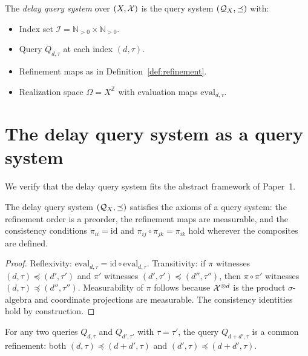 \begin{definition}\label{def:delay-query-system}
The \emph{delay query system} over $(X, \mathcal{X})$ is the query system
$(\mathcal{Q}_X, \preceq)$ with:
\begin{itemize}
  \item Index set $\mathcal{I} = \mathbb{N}_{>0} \times \mathbb{N}_{>0}$.
  \item Query $Q_{d,\tau}$ at each index $(d,\tau)$.
  \item Refinement maps as in Definition~\ref{def:refinement}.
  \item Realization space $\Omega = X^{\mathbb{Z}}$ with evaluation
    maps $\mathrm{eval}_{d,\tau}$.
\end{itemize}
\end{definition}

\section[The delay query system]{The delay query system as a query system}\label{sec:qs-fit}

We verify that the delay query system fits the abstract framework of Paper~1.

\begin{proposition}\label{prop:is-qs}
The delay query system $(\mathcal{Q}_X, \preceq)$ satisfies the axioms of a query
system: the refinement order is a preorder, the refinement maps are measurable,
and the consistency conditions $\pi_{ii} = \mathrm{id}$ and
$\pi_{ij} \circ \pi_{jk} = \pi_{ik}$ hold wherever the composites are defined.
\end{proposition}

\begin{proof}
Reflexivity: $\mathrm{eval}_{d,\tau} = \mathrm{id} \circ \mathrm{eval}_{d,\tau}$.
Transitivity: if $\pi$ witnesses $(d,\tau) \preceq (d',\tau')$ and $\pi'$
witnesses $(d',\tau') \preceq (d'',\tau'')$, then $\pi \circ \pi'$ witnesses
$(d,\tau) \preceq (d'',\tau'')$.  Measurability of $\pi$ follows because
$\mathcal{X}^{\otimes d}$ is the product $\sigma$-algebra and coordinate projections
are measurable.  The consistency identities hold by construction.
\end{proof}

\begin{proposition}\label{prop:upper-directed}
For any two queries $Q_{d,\tau}$ and $Q_{d',\tau'}$ with $\tau = \tau'$,
the query $Q_{d+d', \tau}$ is a common refinement: both
$(d,\tau) \preceq (d+d', \tau)$ and $(d',\tau) \preceq (d+d', \tau)$.
\end{proposition}

